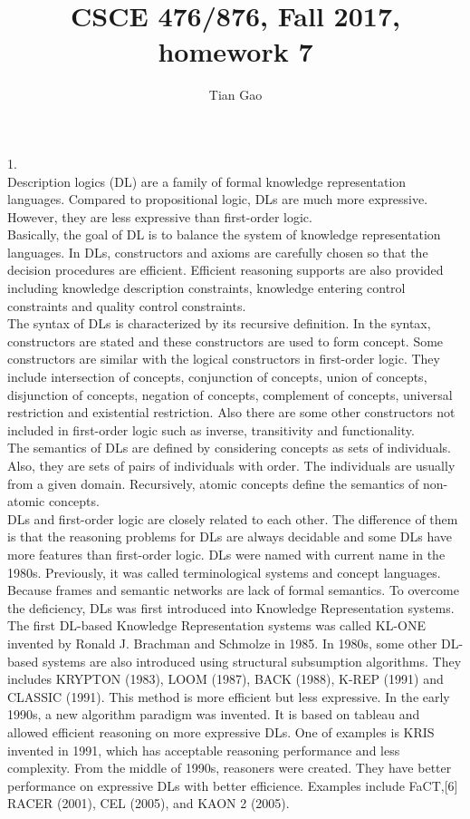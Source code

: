 \documentclass[a4paper]{article}
\title{CSCE 476/876, Fall 2017, homework 7}
\author{Tian Gao}
\begin{document}
\maketitle

1.\\
Description logics (DL) are a family of formal knowledge representation languages. Compared to propositional logic, DLs are much more expressive. However, they are less expressive than first-order logic.\\

Basically, the goal of DL is to balance the system of knowledge representation languages. In DLs, constructors and axioms are carefully chosen so that the decision procedures are efficient. Efficient reasoning supports are also provided including knowledge description constraints, knowledge entering control constraints and quality control constraints.\\

The syntax of DLs is characterized by its recursive definition. In the syntax, constructors are stated and these constructors are used to form concept. Some constructors are similar with the logical constructors in first-order logic. They include intersection of concepts, conjunction of concepts, union of concepts, disjunction of concepts, negation of concepts, complement of concepts, universal restriction and existential restriction. Also there are some other constructors not included in first-order logic such as inverse, transitivity and functionality.\\
The semantics of DLs are defined by considering concepts as sets of individuals. Also, they are sets of pairs of individuals with order. The individuals are usually from a given domain. Recursively, atomic concepts define the semantics of non-atomic concepts.\\

DLs and first-order logic are closely related to each other. The difference of them is that the reasoning problems for DLs are always decidable and some DLs have more features than first-order logic. DLs were named with current name in the 1980s. Previously, it was called terminological systems and concept languages. Because frames and semantic networks are lack of formal semantics. To overcome the deficiency, DLs was first introduced into Knowledge Representation systems. The first DL-based Knowledge Representation systems was called KL-ONE invented by Ronald J. Brachman and Schmolze in 1985. In 1980s, some other DL-based systems are also introduced using structural subsumption algorithms. They includes KRYPTON (1983), LOOM (1987), BACK (1988), K-REP (1991) and CLASSIC (1991). This method is more efficient but less expressive. In the early 1990s, a new algorithm paradigm was invented. It is based on tableau and allowed efficient reasoning on more expressive DLs. One of examples is KRIS invented in 1991, which has acceptable reasoning performance and less complexity. From the middle of 1990s, reasoners were created. They have better performance on expressive DLs with better efficience. Examples include FaCT,[6] RACER (2001), CEL (2005), and KAON 2 (2005).\\
\end{document}
